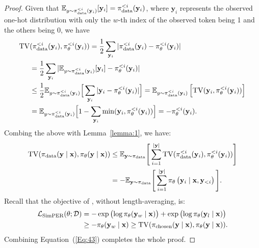 \begin{proof}
Given that $\mathbb{E}_{y \sim \pi_{\rm{data}}^{<i}(\mathbf{y}_{i})}[\mathbf{y}_{i}] = \pi_{\rm{data}}^{<i}(\mathbf{y}_{i})$, where $\mathbf{y}_{i}$ represents the observed one-hot distribution with only the  $w$-th index of the observed token being 1 and the others being 0, we have
\begin{align}
\mathrm{TV}&(\pi_{\rm{data}}^{<i}(\mathbf{y}_{i}), \pi_{\theta}^{<i}(\mathbf{y}_{i}))=\frac{1}{2}\sum_{\mathbf{y}_{i}}|\pi_{\rm{data}}^{<i}(\mathbf{y}_{i})- \pi_{\theta}^{<i}(\mathbf{y}_{i})|\\
&=\frac{1}{2}\sum_{\mathbf{y}_{i}}|\mathbb{E}_{y \sim \pi_{\rm{data}}^{<i}(\mathbf{y}_{i})}[\mathbf{y}_{i}]  - \pi_{\theta}^{<i}(\mathbf{y}_{i})|\\
&\leq \frac{1}{2}\mathbb{E}_{y \sim \pi_{\rm{data}}^{<i}(\mathbf{y}_{i})}\Big[\sum_{\mathbf{y}_{i}}|\mathbf{y}_{i} - \pi_{\theta}^{<i}(\mathbf{y}_{i})| \Big]=\mathbb{E}_{y \sim \pi_{\rm{data}}^{<i}(\mathbf{y}_{i})}\left[\mathrm{TV}(\mathbf{y}_{i},\pi_{\theta}^{<i}(\mathbf{y}_{i})) \right]\\
&=\mathbb{E}_{y \sim \pi_{\rm{data}}^{<i}(\mathbf{y}_{i})}\Big[1-\sum_{\mathbf{y}_{i}} \min (\mathbf{y}_{i},\pi_{\theta}^{<i}(\mathbf{y}_{i})) \Big]=- \pi_{\theta}^{<i}(\mathbf{y}_{i}).
\end{align}
Combing the above with Lemma~\ref{lemma:1}, we have:
\begin{align}
{\mathrm{TV}}(\pi_{\rm{data}}(\mathbf{y} \mid \mathbf{x}), \pi_{\theta}(\mathbf{y} \mid \mathbf{x}))&\leq \mathbb{E}_{\mathbf{y}\sim \pi_{\rm{data}}}\Bigg[ \sum_{i=1}^{|\mathbf{y}|} \mathrm{TV}(\pi_{\rm{data}}^{<i}(\mathbf{y}_{i}),\pi_{\theta}^{<i}(\mathbf{y}_{i})) \Bigg]\\
& = -\mathbb{E}_{\mathbf{y}\sim \pi_{\rm{data}}} \Bigg[\sum_{i=1}^{|\mathbf{y}|}\pi_\theta\left(\mathbf{y}_i \mid \mathbf{x}, \mathbf{y}_{<i}\right)\Bigg].
\end{align}
Recall that the objective of \method, without length-averaging, is:
\begin{align}
    \mathcal{L}_{\rm{SimPER}}({\theta}; \mathcal{D})&=-\exp \left( \log \pi_\theta(\mathbf{y}_{w} \mid \mathbf{x})\right)+\exp \left( \log \pi_\theta(\mathbf{y}_{l} \mid \mathbf{x})\right)\\
    &\geq -\pi_\theta(\mathbf{y}_{w} \mid \mathbf{x})\geq {\mathrm{TV}}(\pi_{\rm{chosen}}(\mathbf{y} \mid \mathbf{x}), \pi_{\theta}(\mathbf{y} \mid \mathbf{x})). \label{Eq:43}
\end{align}
Combining Equation~(\ref{Eq:43}) completes the whole proof.
\end{proof}


